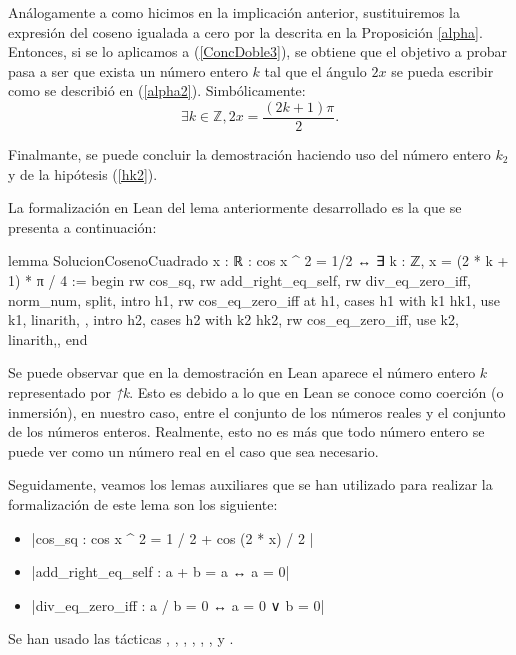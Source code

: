 \begin{demostracion}
    Análogamente a como hicimos en la implicación anterior,
    sustituiremos la expresión del coseno igualada a cero por la
    descrita en la Proposición \ref{alpha}. Entonces, si se lo aplicamos
    a (\ref{ConcDoble3}), se obtiene que el objetivo a probar pasa a ser
    que exista un número entero \(k\) tal que el ángulo \(2x\) se pueda
    escribir como se describió en (\ref{alpha2}). Simbólicamente:
    \begin{equation}
      ∃ k∈ ℤ, 2x = \frac{(2k+1)π}{2}.
    \end{equation}

    Finalmante, se puede concluir la demostración haciendo uso del
    número entero \(k_2\) y de la hipótesis (\ref{hk2}).
\end{demostracion}

La formalización en Lean del lema anteriormente desarrollado es
la que se presenta a continuación:
\begin{leancode}
lemma SolucionCosenoCuadrado
  {x : ℝ}
  : cos x ^ 2 = 1/2 ↔ ∃ k : ℤ, x = (2 * k + 1) * π / 4 :=
begin
  rw cos_sq,
  rw add_right_eq_self,
  rw div_eq_zero_iff,
  norm_num,
  split,
  { intro h1,
    rw cos_eq_zero_iff at h1,
    cases h1 with k1 hk1,
    use k1,
    linarith, },
  { intro h2,
    cases h2 with k2 hk2,
    rw cos_eq_zero_iff,
    use k2,
    linarith,},
end
\end{leancode}

Se puede observar que en la demostración en Lean aparece el número
entero \(k\) representado por \textit{↑k}. Esto es debido a lo que en
Lean se conoce como coerción (o inmersión), en nuestro caso, entre el
conjunto de los números reales y el conjunto de los números
enteros. Realmente, esto no es más que todo número entero se puede ver
como un número real en el caso que sea necesario.

Seguidamente, veamos los lemas auxiliares que se han utilizado
para realizar la formalización de este lema son los siguiente:
\begin{itemize}
\item {}|cos_sq : cos x ^ 2 = 1 / 2 + cos (2 * x) / 2 |
\item {}|add_right_eq_self : a + b = a ↔ a = 0|
\item {}|div_eq_zero_iff : a / b = 0 ↔ a = 0 ∨ b = 0|
\end{itemize}
Se han usado las tácticas
,
,
,
,
,
,
 y
.

